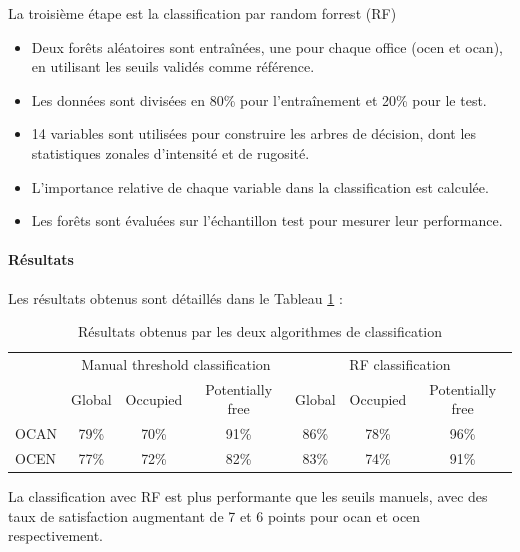 \par{La troisième étape est la classification par random forrest (RF)}
\begin{itemize}
    \item Deux forêts aléatoires sont entraînées, une pour chaque office (\acrshort{ocen} et \acrshort{ocan}), en utilisant les seuils validés comme référence.
    \item Les données sont divisées en 80\% pour l'entraînement et 20\% pour le test.
    \item 14 variables sont utilisées pour construire les arbres de décision, dont les statistiques zonales d'intensité et de rugosité.
    \item L'importance relative de chaque variable dans la classification est calculée.
    \item Les forêts sont évaluées sur l'échantillon test pour mesurer leur performance.
\end{itemize}

\paragraph{Résultats}
\par{Les résultats obtenus sont détaillés dans le Tableau \ref{tab:stdl_01_resultats_classification} :}
\begin{table}[h]
    \centering
    \begin{tabular}{|l|c|c|c||c|c|c|}
    \hline
    \multirow{2}{*}{} & \multicolumn{3}{c||}{Manual threshold classification} & \multicolumn{3}{c|}{RF classification} \\
    \cline{2-7}
    & Global & Occupied & Potentially free & Global & Occupied & Potentially free \\
    \hline
    OCAN & 79\% & 70\% & 91\% & 86\% & 78\% & 96\% \\
    OCEN & 77\% & 72\% & 82\% & 83\% & 74\% & 91\% \\
    \hline
    \end{tabular}
    \caption{Résultats obtenus par les deux algorithmes de classification}
    \label{tab:stdl_01_resultats_classification}
\end{table}
\par{La classification avec RF est plus performante que les seuils manuels, avec des taux de satisfaction augmentant de 7 et 6 points pour \acrshort{ocan} et \acrshort{ocen} respectivement.}

